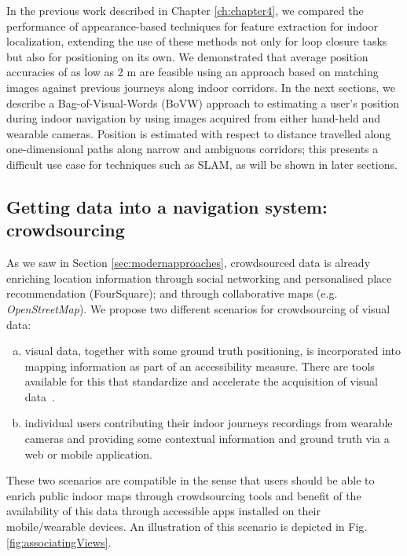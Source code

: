 In the previous work \citep{RiveraWearable} described in Chapter \ref{ch:chapter4}, we compared the performance of appearance-based techniques for feature extraction for indoor localization, extending the use of these methods not only for loop closure tasks but also for positioning on its own. We demonstrated that average position accuracies of as low as 2 m are feasible using an approach based on matching images against previous journeys along indoor corridors.  In the next sections, we describe a Bag-of-Visual-Words (BoVW) approach to estimating a user's position during indoor navigation by using images acquired from either hand-held and wearable cameras.  Position is estimated with respect to distance travelled along one-dimensional paths along narrow and ambiguous corridors; this presents a difficult use case for techniques such as SLAM, as will be shown in later sections.

\subsection{Getting data into a navigation system: crowdsourcing}
As we saw in Section \ref{sec:modernapproaches}, crowdsourced data is already enriching location information through social networking and personalised place recommendation (FourSquare); and through collaborative maps (e.g. {\it OpenStreetMap}). We propose two different scenarios for crowdsourcing of visual data:
\begin{enumerate}[a)] 
\item  visual data, together with some ground truth positioning, is incorporated into mapping information as part of an accessibility measure. There are tools available for this that standardize and accelerate the acquisition of visual data~\citep{navvisTrolley}.
\item individual users contributing their indoor journeys recordings from wearable cameras and providing some contextual information and ground truth via a web or mobile application. 
\end{enumerate}

These two scenarios are compatible in the sense that users should be able to enrich public indoor maps through crowdsourcing tools and benefit of the availability of this data through accessible apps installed on their mobile/wearable devices. An illustration of this scenario is depicted in Fig. \ref{fig:associatingViews}.

